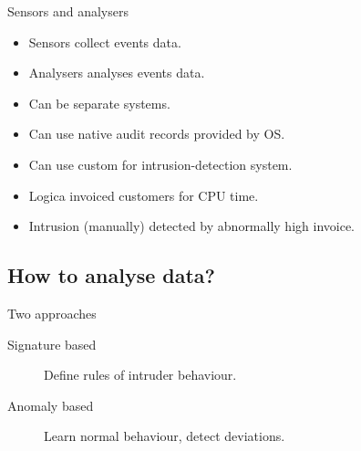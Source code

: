 \begin{frame}
  \begin{block}{Sensors and analysers}
    \begin{itemize}
      \item Sensors collect events data.
      \item Analysers analyses events data.
      \item Can be separate systems.
    \end{itemize}
  \end{block}
\end{frame}

\begin{frame}
  \begin{remark}
    \begin{itemize}
      \item Can use native audit records provided by OS.
      \item Can use custom for intrusion-detection system.
    \end{itemize}
  \end{remark}

  \pause

  \begin{example}
    \begin{itemize}
      \item Logica invoiced customers for CPU time.
      \item Intrusion (manually) detected by abnormally high invoice.
    \end{itemize}
  \end{example}
\end{frame}


\subsection{How to analyse data?}

\begin{frame}
  \begin{block}{Two approaches}
    \begin{description}
      \item[Signature based] Define rules of intruder behaviour.
      \item[Anomaly based] Learn normal behaviour, detect deviations.
    \end{description}
  \end{block}
\end{frame}

